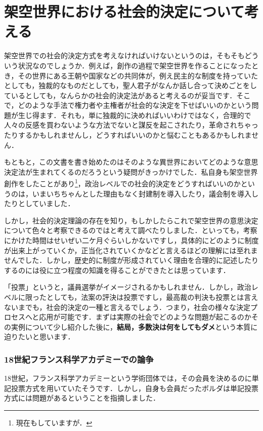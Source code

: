 \section{架空世界における社会的決定について考える}
架空世界での社会的決定方式を考えなければいけないというのは，そもそもどういう状況なのでしょうか．例えば，創作の過程で架空世界を作ることになったとき，その世界にある王朝や国家などの共同体が，例え民主的な制度を持っていたとしても，独裁的なものだとしても，聖人君子がなんか話し合って決めごとをしているとしても，なんらかの社会的決定法があると考えるのが妥当です．そこで，どのような手法で権力者や主権者が社会的な決定を下せばいいのかという問題が生じ得ます．それも，単に独裁的に決めればいいわけではなく，合理的で人々の反感を買わないような方法でないと謀反を起こされたり，革命されちゃったりするかもしれませんし，どうすればいいのかと悩むこともあるかもしれません．

もともと，この文書を書き始めたのはそのような異世界においてどのような意思決定法が生まれてくるのだろうという疑問がきっかけでした．私自身も架空世界創作をしたことがあり\footnote{現在もしていますが．}，政治レベルでの社会的決定をどうすればいいのかというのは，いまいちちゃんとした理由もなく封建制を導入したり，議会制を導入したりとしていました．

しかし，社会的決定理論の存在を知り，もしかしたらこれで架空世界の意思決定について色々と考察できるのではと考えて調べたりしました．といっても，考察にかけた時間はせいぜい二ケ月ぐらいしかないですし，具体的にどのように制度が出来上がっていくか，正当化されていくかなどと言えるほどの理解には至れませんでした．しかし，歴史的に制度が形成されていく理由を合理的に記述したりするのには役に立つ程度の知識を得ることができたとは思っています．

「投票」というと，議員選挙がイメージされるかもしれません．しかし，政治レベルに限ったとしても，法案の評決は投票ですし，最高裁の判決も投票とは言えないまでも，社会的決定の一種と言えるでしょう．つまり，社会の様々な決定プロセスへと応用が可能です．まずは実際の社会でどのような問題が起こるのかその実例について少し紹介した後に，{\bf 結局，多数決は何をしてもダメ}という本質に迫りたいと思います．

\subsubsection*{18世紀フランス科学アカデミーでの論争}
18世紀，フランス科学アカデミーという学術団体では，その会員を決めるのに単記投票方式を用いていたそうです．しかし，自身も会員だったボルダは単記投票方式には問題があるということを指摘しました．

